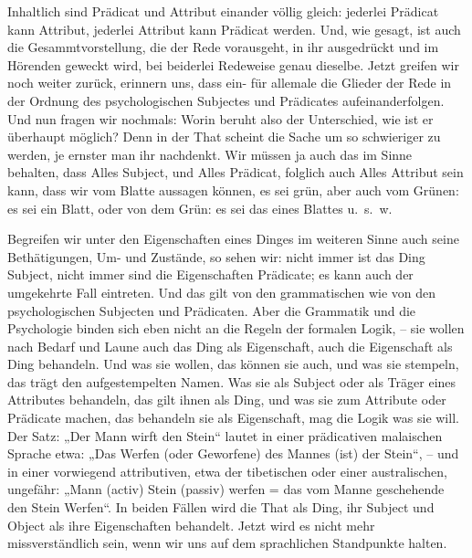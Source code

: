 Inhaltlich sind Prädicat und Attribut einander völlig gleich: jederlei Prädicat kann Attribut, jederlei Attribut kann Prädicat werden. Und, wie gesagt, ist auch die Gesammtvorstellung, die der Rede vorausgeht, in ihr ausgedrückt und im Hörenden geweckt wird, bei beiderlei Redeweise genau dieselbe. Jetzt greifen wir noch weiter zurück, erinnern uns, dass ein- für allemale die Glieder der Rede in der Ordnung des psychologischen Subjectes und Prädicates aufeinanderfolgen. Und nun fragen wir nochmals: Worin beruht also der Unterschied, wie ist er überhaupt möglich? Denn in der That scheint die Sache um so schwieriger zu werden, je ernster man ihr nachdenkt. Wir müssen ja auch das im Sinne behalten, dass Alles Subject, und Alles Prädicat, folglich auch Alles Attribut sein kann, dass wir vom Blatte aussagen können, es sei grün, \label{sp.454} aber auch vom Grünen: es sei ein Blatt, oder von dem Grün: es sei das eines Blattes u.~s.~w.

\largerpage[-1]Begreifen wir unter den Eigenschaften eines Dinges im weiteren Sinne auch seine Bethätigungen, Um- und Zustände, so sehen wir: nicht immer ist das Ding Subject, nicht immer sind die Eigenschaften Prädicate; es kann auch der umgekehrte Fall eintreten. Und das gilt von den grammatischen wie von den psychologischen Subjecten und Prädicaten. Aber die Grammatik und die Psychologie binden sich eben nicht an die Regeln der formalen Logik, – sie wollen nach Bedarf und Laune auch das Ding als Eigenschaft, auch die Eigenschaft als Ding behandeln. Und was sie wollen, das können sie auch, und was sie stempeln, das trägt den aufgestempelten Namen. Was sie als Subject oder als Träger eines Attributes behandeln, das gilt ihnen als Ding, und was sie zum Attribute oder Prädicate machen, das behandeln sie als Eigenschaft, mag die Logik  was sie will. Der Satz: „Der Mann wirft den Stein“ lautet in einer prädicativen malaischen Sprache etwa: „Das Werfen \label{fp.434} (oder Geworfene) des Mannes (ist) der Stein“, – und in einer vorwiegend attributiven, etwa der tibetischen oder einer australischen, ungefähr: „Mann (activ) Stein (passiv) werfen = das vom Manne geschehende den Stein Werfen“. In beiden Fällen wird die That als Ding, ihr Subject und Object als ihre Eigenschaften behandelt. Jetzt wird es nicht mehr missverständlich sein, wenn wir uns auf dem sprachlichen Standpunkte halten.

